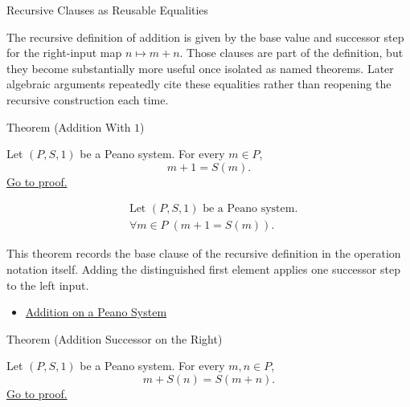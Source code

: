 \begin{topicbox}{Recursive Clauses as Reusable Equalities}
\begin{exposition}
The recursive definition of addition is given by the base value and successor
step for the right-input map $n \mapsto m+n$. Those clauses are part of the
definition, but they become substantially more useful once isolated as named
theorems. Later algebraic arguments repeatedly cite these equalities rather
than reopening the recursive construction each time.
\end{exposition}

\begin{theorembox}{Theorem (Addition With \texorpdfstring{$1$}{1})}
\begin{theorem}
\label{thm:addition-with-one}
Let $(P,S,1)$ be a Peano system. For every $m \in P$,
\[
m+1=S(m).
\]
\hyperref[prf:addition-with-one]{Go to proof.}
\end{theorem}
\end{theorembox}

\begin{remark*}
\[
\begin{aligned}
&\text{Let } (P,S,1) \text{ be a Peano system.}\\
&\forall m \in P\;(m+1=S(m)).
\end{aligned}
\]
\end{remark*}

\begin{remark*}[Interpretation]
This theorem records the base clause of the recursive definition in the
operation notation itself. Adding the distinguished first element applies one
successor step to the left input.
\end{remark*}

\begin{dependencies}
\begin{itemize}
  \item \hyperref[def:addition-on-peano-system]{Addition on a Peano System}
\end{itemize}
\end{dependencies}

\begin{theorembox}{Theorem (Addition Successor on the Right)}
\begin{theorem}
\label{thm:addition-successor-on-right}
Let $(P,S,1)$ be a Peano system. For every $m,n \in P$,
\[
m+S(n)=S(m+n).
\]
\hyperref[prf:addition-successor-on-right]{Go to proof.}
\end{theorem}
\end{theorembox}


\end{topicbox}
